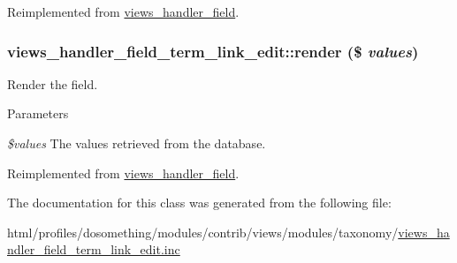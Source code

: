 Reimplemented from \hyperlink{classviews__handler__field_a4f661f91bcbe80d4a00c30a31456c502}{views\_\-handler\_\-field}.\hypertarget{classviews__handler__field__term__link__edit_a626104d5ff55d23f8e07f1bec3336b2c}{
\subsubsection[{render}]{\setlength{\rightskip}{0pt plus 5cm}views\_\-handler\_\-field\_\-term\_\-link\_\-edit::render (\$ {\em values})}}
\label{classviews__handler__field__term__link__edit_a626104d5ff55d23f8e07f1bec3336b2c}
Render the field.


\begin{DoxyParams}{Parameters}
\item[{\em \$values}]The values retrieved from the database. \end{DoxyParams}


Reimplemented from \hyperlink{classviews__handler__field_a82ff951c5e9ceb97b2eab86f880cbc1e}{views\_\-handler\_\-field}.

The documentation for this class was generated from the following file:\begin{DoxyCompactItemize}
\item 
html/profiles/dosomething/modules/contrib/views/modules/taxonomy/\hyperlink{views__handler__field__term__link__edit_8inc}{views\_\-handler\_\-field\_\-term\_\-link\_\-edit.inc}\end{DoxyCompactItemize}
